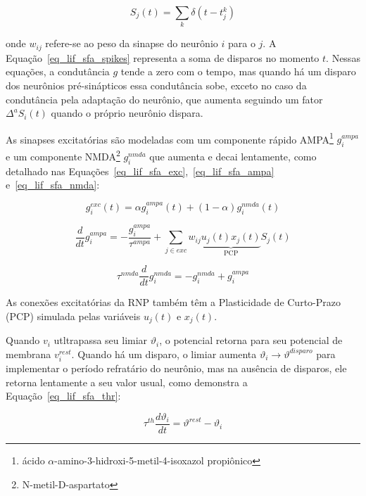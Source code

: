 \begin{equation}
\label{eq_lif_sfa_spikes}
S_j(t) = \sum_{k}{\delta(t-t_j^k)}
\end{equation}

\noindent{}onde $w_{ij}$ refere-se ao peso da sinapse do neurônio $i$ para o $j$. A Equação~\ref{eq_lif_sfa_spikes} representa a
soma de disparos no momento $t$. Nessas equações, a condutância $g$ tende a zero com o tempo, mas quando há um disparo dos
neurônios pré-sinápticos essa condutância sobe, exceto no caso da condutância pela adaptação do neurônio, que aumenta seguindo um
fator $\Delta^{a}S_i(t)$ quando o próprio neurônio dispara.

As sinapses excitatórias são modeladas com um componente rápido AMPA\footnote{ácido $\alpha$-amino-3-hidroxi-5-metil-4-isoxazol
propiônico} $g_i^{ampa}$ e um componente NMDA\footnote{N-metil-D-aspartato} $g_i^{nmda}$ que aumenta e decai lentamente, como
detalhado nas Equações~\ref{eq_lif_sfa_exc},~\ref{eq_lif_sfa_ampa} e~\ref{eq_lif_sfa_nmda}:

\begin{equation}
\label{eq_lif_sfa_exc}
g_i^{exc}(t) = \alpha g_i^{ampa}(t) + (1-\alpha)g_i^{nmda}(t)
\end{equation}

\begin{equation}
\label{eq_lif_sfa_ampa}
\frac{d}{dt}g_i^{ampa} = -\frac{g_i^{ampa}}{\tau^{ampa}} + \sum_{j\in exc}{w_{ij} 
\underbrace{u_j(t)x_j(t)}_{\text{PCP}}
S_j(t)}
\end{equation}

\begin{equation}
\label{eq_lif_sfa_nmda}
\tau^{nmda} \frac{d}{dt}g_i^{nmda} = -g_i^{nmda} + g_i^{ampa}
\end{equation}

As conexões excitatórias da RNP também têm a Plasticidade de Curto-Prazo (PCP) simulada pelas variáveis $u_j(t)$ e $x_j(t)$.

Quando $v_i$ utltrapassa seu limiar $\vartheta_i$, o potencial retorna para seu potencial de membrana $v_i^{rest}$. Quando há um
disparo, o limiar aumenta $\vartheta_i \rightarrow \vartheta^{disparo}$ para implementar o período refratário do neurônio, mas na
ausência de disparos, ele retorna lentamente a seu valor usual, como demonstra a Equação~\ref{eq_lif_sfa_thr}:

\begin{equation}
\label{eq_lif_sfa_thr}
\tau^{th}\frac{d\vartheta_i}{dt} = \vartheta^{rest} - \vartheta_i
\end{equation}


